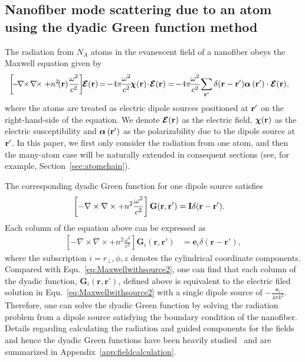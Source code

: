 \documentclass[preprint,aps,pra,onecolumn]{revtex4-1} %
\begin{document}
\subsection{Nanofiber mode scattering due to an atom using the dyadic Green function method}\label{sec:GFmethod}

The radiation from $N_A$ atoms in the evanescent field of a nanofiber obeys the Maxwell equation given by
\begin{align}\label{eq:Maxwellwithsource2}
\left[\! -\! \nabla\!\!\times\!\nabla\!\!\times + n^2\!(\br)\frac{\omega^2}{c^2} \right]\!\! \boldsymbol{\mathcal{E}}(\br) &\!=\! -4\pi\! \frac{\omega^2}{c^2}\! \boldsymbol{\chi}(\br)\! \cdot\! \boldsymbol{\mathcal{E}}(\br)=\!-4\pi\! \frac{\omega^2}{c^2}\!\sum_{\br'}\delta(\br-\br')\boldsymbol{\alpha} \, (\br')\cdot \boldsymbol{\mathcal{E}}(\br),
\end{align}
where the atoms are treated as electric dipole sources positioned at $\mathbf{r}'$ on the right-hand-side of the equation. We denote $\boldsymbol{\mathcal{E}}(\mathbf{r})$ as the electric field, $\boldsymbol{\chi}(\mathbf{r})$ as the electric susceptibility and $\boldsymbol{\alpha} \, (\mathbf{r}')$ as the polarizability due to the dipole source at $\mathbf{r}'$. In this paper, we first only consider the radiation from one atom, and then the many-atom case will be naturally extended in consequent sections (see, for example, Section~\ref{sec:atomchain}). 

The corresponding dyadic Green function for one dipole source satisfies
\begin{align}
\left[ -\nabla\times\nabla\times + n^2\frac{\omega^2}{c^2} \right] \mathbf{G}(\mathbf{r},\mathbf{r}') &= \mathbf{I}\delta(\mathbf{r}-\mathbf{r}'). 
\end{align}
Each column of the equation above can be expressed as
\begin{align}\label{eq:GFcolumneq}
\left[ -\nabla\times\nabla\times + n^2\frac{\omega^2}{c^2} \right] \mathbf{G}_i(\mathbf{r},\mathbf{r}') &= \mathbf{e}_i\delta(\mathbf{r}-\mathbf{r}'), 
\end{align}
where the subscription $ i=r\!_\perp,\phi,z $ denotes the cylindrical coordinate components. Compared with Equ.~\eqref{eq:Maxwellwithsource2}, one can find that each column of the dyadic function, $\mathbf{G}_i(\mathbf{r},\mathbf{r}')$, defined above is equivalent to the electric filed solution in Equ.~\eqref{eq:Maxwellwithsource2} with a single dipole source of $-\frac{\mathbf{e}_i}{4\pi k^2}$. Therefore, one can solve the dyadic Green function by solving the radiation problem from a dipole source satisfying the boundary condition of the nanofiber. Details regarding calculating the radiation and guided components for the fields and hence the dyadic Green functions have been heavily studied~\cite{Klimov2004,Nha1997,Maslov2006} and are summarized in Appendix~\ref{app:fieldcalculation}.
\end{document}
